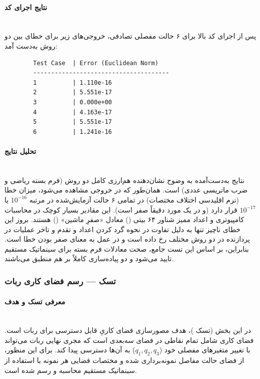 \documentclass{article}
\begin{document}
\paragraph{نتایج اجرای کد}\mbox{}\\
پس از اجرای کد بالا برای ۶ حالت مفصلی تصادفی، خروجی‌های زیر برای خطای بین دو روش به‌دست آمد:

\begin{latin}
	\begin{verbatim}
		Test Case  | Error (Euclidean Norm)   
		--------------------------------------
		1          | 1.110e-16
		2          | 5.551e-17
		3          | 0.000e+00
		4          | 4.163e-17
		5          | 5.551e-17
		6          | 1.241e-16
	\end{verbatim}
\end{latin}

\paragraph{تحلیل نتایج}\mbox{}\\
نتایج به‌دست‌آمده به وضوح نشان‌دهنده هم‌ارزی کامل دو روش (فرم بسته ریاضی و ضرب ماتریسی عددی) است. همان‌طور که در خروجی مشاهده می‌شود، میزان خطا (نرم اقلیدسی اختلاف مختصات) در تمامی ۶ حالت آزمایش‌شده در مرتبه $10^{-16}$ یا $10^{-17}$ قرار دارد (و در یک مورد دقیقاً صفر است). 
این مقادیر بسیار کوچک در محاسبات کامپیوتری و اعداد ممیز شناور ۶۴ بیتی () معادل «صفرِ ماشین» () هستند. بروز این خطای ناچیز تنها به دلیل تفاوت در نحوه گرد کردن اعداد و تقدم و تاخر عملیات در پردازنده در دو روش مختلف رخ داده است و در عمل به معنای صفر بودن خطا است. بنابراین، بر اساس این تست جامع، صحت معادلات فرم بسته برای سینماتیک مستقیم تایید می‌شود و دو پیاده‌سازی کاملاً بر هم منطبق می‌باشند.
\subsubsection{تسک  — رسم فضای کاری ربات }
\paragraph{معرفی تسک و هدف}\mbox{}\\
در این بخش (تسک )، هدف مصورسازی فضای کاریِ قابل دسترسی  برای ربات است. فضای کاری شامل تمام نقاطی در فضای سه‌بعدی است که مجری نهایی  ربات می‌تواند با تغییر متغیرهای مفصلی خود ($q_1, q_2, q_3$) به آن‌ها دسترسی پیدا کند. برای این منظور، از فضای حالت مفاصل نمونه‌برداری شده و مختصات فضایی هر نمونه با استفاده از سینماتیک مستقیم محاسبه و رسم شده است.
\end{document}
